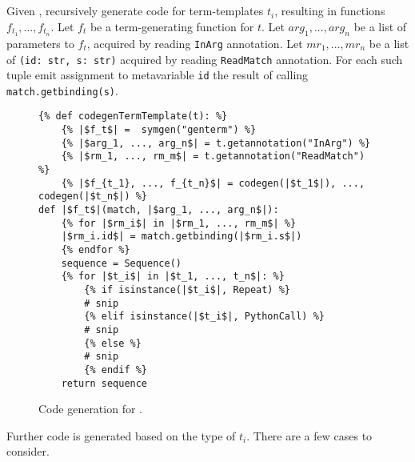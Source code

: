 \subsection{\TermSequenceNoArg}

Given \TermSequence, recursively generate code for term-templates $t_i$, resulting in functions $f_{t_1},..., f_{t_n}$. Let $f_t$ be a term-generating function for $t$. Let $arg_1, ..., arg_n$ be a list of parameters to $f_t$, acquired by reading \texttt{InArg} annotation. Let $mr_1, ..., mr_n$ be a list of \texttt{(id: str, s: str)} acquired by reading \texttt{ReadMatch} annotation. For each such tuple emit assignment to metavariable \texttt{id} the result of calling \texttt{match.getbinding(s)}.


\begin{figure}
\begin{verbatim}
{% def codegenTermTemplate(t): %}
	{% |$f_t$| =  symgen("genterm") %}
	{% |$arg_1, ..., arg_n$| = t.getannotation("InArg") %}
	{% |$rm_1, ..., rm_m$| = t.getannotation("ReadMatch") %}
	{% |$f_{t_1}, ..., f_{t_n}$| = codegen(|$t_1$|), ..., codegen(|$t_n$|) %}
def |$f_t$|(match, |$arg_1, ..., arg_n$|):
	{% for |$rm_i$| in |$rm_1, ..., rm_m$| %}
	|$rm_i.id$| = match.getbinding(|$rm_i.s$|)
	{% endfor %}
	sequence = Sequence()
	{% for |$t_i$| in |$t_1, ..., t_n$|: %}
		{% if isinstance(|$t_i$|, Repeat) %}
		# snip
		{% elif isinstance(|$t_i$|, PythonCall) %}
		# snip
		{% else %}
		# snip
		{% endif %}
	return sequence
\end{verbatim}
\caption{Code generation for \TermSequenceNoArg.}
\label{codegen-term-sequence}
\end{figure}

Further code is generated based on the type of $t_i$. There are a few cases to consider.

